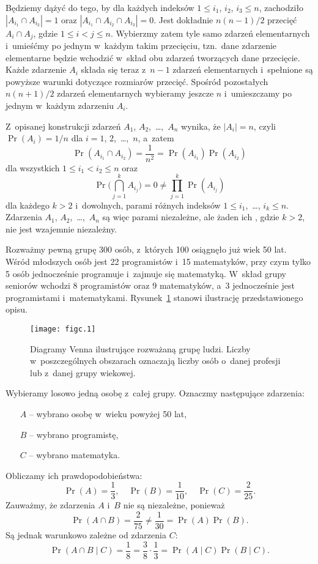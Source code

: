 Będziemy dążyć do tego, by dla każdych indeksów $1\le i_1$, $i_2$, $i_3\le n$, zachodziło $|A_{i_1}\cap A_{i_2}|=1$ oraz $|A_{i_1}\cap A_{i_2}\cap A_{i_3}|=0$. Jest dokładnie $n(n-1)/2$ przecięć $A_i\cap A_j$, gdzie $1\le i<j\le n$. Wybierzmy zatem tyle samo zdarzeń elementarnych i~umieśćmy po jednym w~każdym takim przecięciu, tzn.\ dane zdarzenie elementarne będzie wchodzić w~skład obu zdarzeń tworzących dane przecięcie. Każde zdarzenie $A_i$ składa się teraz z~$n-1$ zdarzeń elementarnych i~spełnione są powyższe warunki dotyczące rozmiarów przecięć. Spośród pozostałych $n(n+1)/2$ zdarzeń elementarnych wybieramy jeszcze $n$ i~umieszczamy po jednym w~każdym zdarzeniu $A_i$.

Z~opisanej konstrukcji zdarzeń $A_1$, $A_2$,~\dots,~$A_n$ wynika, że $|A_i|=n$, czyli $\Pr(A_i)=1/n$ dla $i=1$, 2,~\dots,~$n$, a~zatem
\[
	\Pr(A_{i_1}\cap A_{i_2}) = \frac{1}{n^2} = \Pr(A_{i_1})\Pr(A_{i_2})
\]
dla wszystkich $1\le i_1<i_2\le n$ oraz
\[
	\Pr\biggl(\bigcap_{j=1}^kA_{i_j}\biggr) = 0 \ne \prod_{j=1}^k\Pr(A_{i_j})
\]
dla każdego $k>2$ i~dowolnych, parami różnych indeksów $1\le i_1$,~\dots, $i_k\le n$. Zdarzenia $A_1$, $A_2$,~\dots,~$A_n$ są więc parami niezależne, ale żaden ich , gdzie $k>2$, nie jest wzajemnie niezależny.

\exercise %
Rozważmy pewną grupę 300 osób, z~których 100 osiągnęło już wiek 50 lat. Wśród młodszych osób jest 22 programistów i~15 matematyków, przy czym tylko 5 osób jednocześnie programuje i~zajmuje się matematyką. W~skład grupy seniorów wchodzi 8 programistów oraz 9 matematyków, a~3 jednocześnie jest programistami i~matematykami. Rysunek~\ref{fig:C.2-8} stanowi ilustrację przedstawionego opisu.
\begin{figure}[ht]
	\begin{center}
		\texttt{[image: figc.1]}
	\end{center}
	\caption{Diagramy Venna ilustrujące rozważaną grupę ludzi. Liczby w~poszczególnych obszarach oznaczają liczby osób o~danej profesji lub z~danej grupy wiekowej.} \label{fig:C.2-8}
\end{figure}

Wybieramy losowo jedną osobę z~całej grupy. Oznaczmy następujące zdarzenia:
\begin{itemize}
	\item[$A$] -- wybrano osobę w~wieku powyżej 50 lat,
	\item[$B$] -- wybrano programistę,
	\item[$C$] -- wybrano matematyka.
\end{itemize}
Obliczamy ich prawdopodobieństwa:
\[
	\Pr(A) = \frac{1}{3}, \quad \Pr(B) = \frac{1}{10}, \quad \Pr(C) = \frac{2}{25}.
\]
Zauważmy, że zdarzenia $A$ i~$B$ nie są niezależne, ponieważ
\[
	\Pr(A\cap B) = \frac{2}{75} \ne \frac{1}{30} = \Pr(A)\Pr(B).
\]
Są jednak warunkowo zależne od zdarzenia $C$:
\[
	\Pr(A\cap B\mid C) = \frac{1}{8} = \frac{3}{8}\cdot\frac{1}{3} = \Pr(A\mid C)\Pr(B\mid C).
\]

